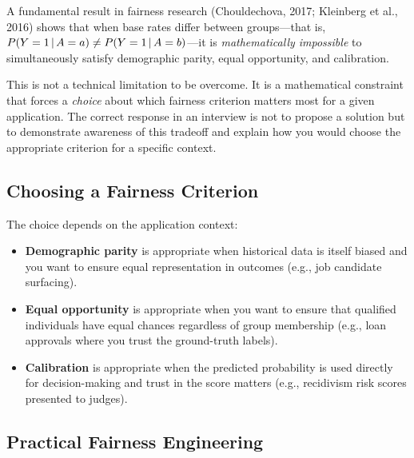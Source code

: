 A fundamental result in fairness research (Chouldechova, 2017; Kleinberg et al.,
2016) shows that when base rates differ between groups---that is,
$P(Y=1 \,|\, A=a) \neq P(Y=1 \,|\, A=b)$---it is \emph{mathematically
impossible} to simultaneously satisfy demographic parity, equal opportunity,
and calibration.

This is not a technical limitation to be overcome.  It is a mathematical
constraint that forces a \emph{choice} about which fairness criterion matters
most for a given application.  The correct response in an interview is not to
propose a solution but to demonstrate awareness of this tradeoff and explain
how you would choose the appropriate criterion for a specific context.

\subsection{Choosing a Fairness Criterion}

The choice depends on the application context:

\begin{itemize}
    \item \textbf{Demographic parity} is appropriate when historical data is
    itself biased and you want to ensure equal representation in outcomes
    (e.g., job candidate surfacing).
    \item \textbf{Equal opportunity} is appropriate when you want to ensure
    that qualified individuals have equal chances regardless of group
    membership (e.g., loan approvals where you trust the ground-truth labels).
    \item \textbf{Calibration} is appropriate when the predicted probability
    is used directly for decision-making and trust in the score matters
    (e.g., recidivism risk scores presented to judges).
\end{itemize}

\subsection{Practical Fairness Engineering}

